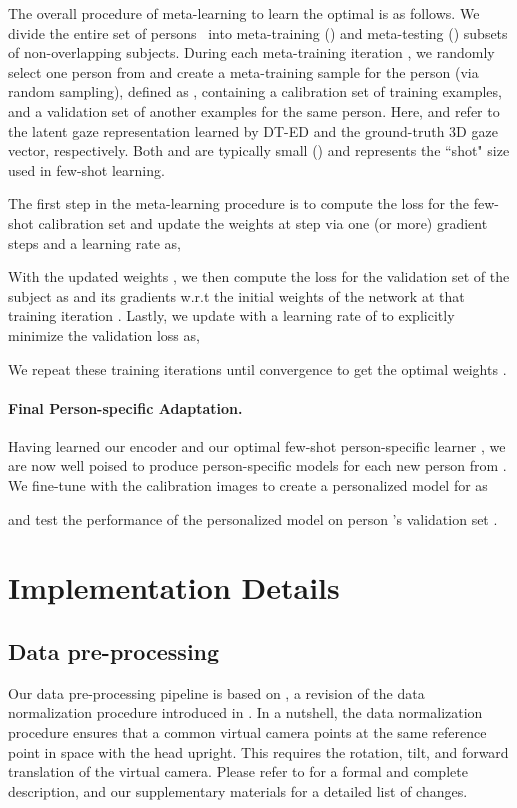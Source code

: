 \documentclass[10pt,twocolumn,letterpaper]{article}
\begin{document}
The overall procedure of meta-learning to learn the optimal  is as follows. 
We divide the entire set of persons~ into meta-training () and meta-testing () subsets of non-overlapping subjects.
During each meta-training iteration , we randomly select one person  from  and create a meta-training sample for the person (via random sampling), defined as , containing a calibration set  of  training examples, and a validation set  of another  examples for the same person.
Here,  and  refer to the latent gaze representation learned by DT-ED and the ground-truth 3D gaze vector, respectively. 
Both  and  are typically small () and  represents the ``shot" size used in few-shot learning.

The first step in the meta-learning procedure is to compute the loss for the few-shot calibration set  and update the weights  at step  via one (or more) gradient steps and a learning rate  as,

With the updated weights , we then compute the loss for the validation set  of the subject   as  and its gradients w.r.t the initial weights of the network  at that training iteration . Lastly, we update  with a learning rate of  to explicitly minimize the validation loss as,


We repeat these training iterations until convergence to get the optimal weights .







\paragraph{Final Person-specific Adaptation.}
Having learned our encoder and our optimal few-shot person-specific learner , we are now well poised to produce person-specific models for each new person  from . We fine-tune  with the  calibration images  to create a personalized model for  as

and test the performance of the personalized model  on person 's validation set .






\section{Implementation Details}

\subsection{Data pre-processing\label{sec:pre-processing}}
Our data pre-processing pipeline is based on \cite{Zhang2018ETRA}, a revision of the data normalization procedure introduced in \cite{Sugano2014CVPR}. In a nutshell, the data normalization procedure ensures that a common virtual camera points at the same reference point in space with the head upright. This requires the rotation, tilt, and forward translation of the virtual camera. Please refer to \cite{Zhang2018ETRA} for a formal and complete description, and our supplementary materials for a detailed list of changes.
\end{document}
